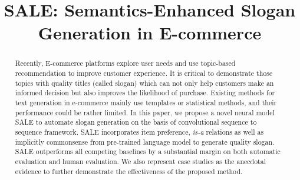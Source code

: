 \documentclass[sigconf,UTF8]{acmart} %
\theoremstyle{definition}
\newcommand{\KZ}[1]{\textcolor{red}{Kenny: #1}}
\begin{document}
\title{SALE: Semantics-Enhanced Slogan Generation in E-commerce}

\author{
}
	

\begin{abstract}
	Recently, E-commerce platforms explore user needs and use topic-based recommendation to
	improve customer experience.  It is critical to demonstrate those topics with quality titles (called slogan) which can not only help customers make an informed decision but also improves the 
	likelihood of purchase.
	Existing methods for text generation in e-commerce mainly use templates or statistical methods, and their performance could be rather limited. 
	In this paper, we propose a novel neural model SALE to automate slogan generation on the basis of convolutional sequence to sequence framework.
	SALE incorporates item preference, \emph{is-a} relations as well as implicitly commonsense 
	from pre-trained language model to generate quality slogan.
	SALE outperforms all competing baselines by a substantial margin on both automatic evaluation and human evaluation.
	We also represent case studies as the anecdotal evidence to further
	demonstrate the effectiveness of the proposed method.

\end{abstract}


\maketitle

\begin{CJK}{UTF8}{gkai}








\end{CJK}



\end{document}
